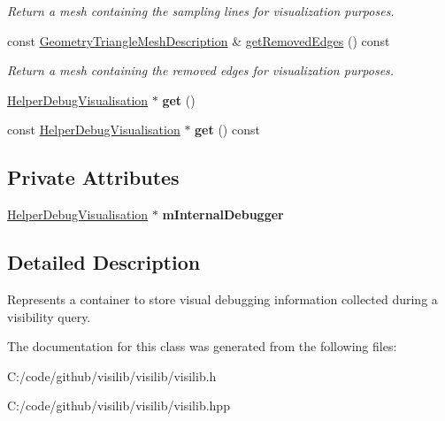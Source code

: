 \begin{DoxyCompactItemize}
\begin{DoxyCompactList}\small\item\em Return a mesh containing the sampling lines for visualization purposes. \end{DoxyCompactList}\item 
\mbox{\label{classvisilib_1_1_helper_visual_debugger_a1a39f8208d08b175e66f58583bbc14f2}} 
const \mbox{\hyperlink{structvisilib_1_1_geometry_triangle_mesh_description}{Geometry\+Triangle\+Mesh\+Description}} \& \mbox{\hyperlink{classvisilib_1_1_helper_visual_debugger_a1a39f8208d08b175e66f58583bbc14f2}{get\+Removed\+Edges}} () const
\begin{DoxyCompactList}\small\item\em Return a mesh containing the removed edges for visualization purposes. \end{DoxyCompactList}\item 
\mbox{\label{classvisilib_1_1_helper_visual_debugger_afd8630bb83bd0b6ae4664e6d06de1391}} 
\mbox{\hyperlink{classvisilib_1_1_helper_debug_visualisation}{Helper\+Debug\+Visualisation}} $\ast$ {\bfseries get} ()
\item 
\mbox{\label{classvisilib_1_1_helper_visual_debugger_a31e01e642fb2898714d45d3abbb426d6}} 
const \mbox{\hyperlink{classvisilib_1_1_helper_debug_visualisation}{Helper\+Debug\+Visualisation}} $\ast$ {\bfseries get} () const
\end{DoxyCompactItemize}
\subsection*{Private Attributes}
\begin{DoxyCompactItemize}
\item 
\mbox{\label{classvisilib_1_1_helper_visual_debugger_ab8984f9d49af7c99033b6197c99a36b9}} 
\mbox{\hyperlink{classvisilib_1_1_helper_debug_visualisation}{Helper\+Debug\+Visualisation}} $\ast$ {\bfseries m\+Internal\+Debugger}
\end{DoxyCompactItemize}


\subsection{Detailed Description}
Represents a container to store visual debugging information collected during a visibility query. 

The documentation for this class was generated from the following files\+:\begin{DoxyCompactItemize}
\item 
C\+:/code/github/visilib/visilib/visilib.\+h\item 
C\+:/code/github/visilib/visilib/visilib.\+hpp\end{DoxyCompactItemize}
